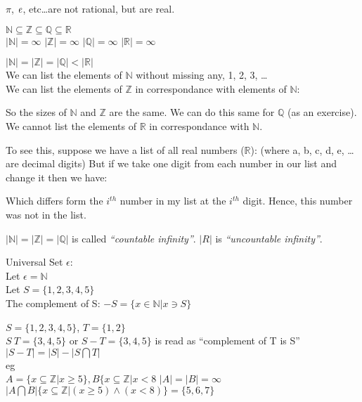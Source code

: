 $\pi$, $\emph{e}$, etc\ldots are not rational, but are real.

$\mathbb{N} \subseteq \mathbb{Z} \subseteq \mathbb{Q} \subseteq \mathbb{R} $ \\

$|\mathbb{N}| = \infty$
$|\mathbb{Z}| = \infty$
$|\mathbb{Q}| = \infty$
$|\mathbb{R}| = \infty$

$|\mathbb{N}| = |\mathbb{Z}| = |\mathbb{Q}| < |\mathbb{R}|$ \\
We can list the elements of $\mathbb{N}$ without missing any, 1, 2, 3, \ldots \\
We can list the elements of $\mathbb{Z}$ in correspondance with elements of $\mathbb{N}:$

%
%

So the sizes of $\mathbb{N}$ and $\mathbb{Z}$ are the same. We can do this same for $\mathbb{Q}$
(as an exercise). We cannot list the elements of $\mathbb{R}$ in correspondance with $\mathbb{N}$.

To see this, suppose we have a list of all real numbers ($\mathbb{R}$):
(where a, b, c, d, e, \ldots are decimal digits)
But if we take one digit from each number in our list and change it then we have:

Which differs form the $i^{th}$ number in my list at the $i^{th}$ digit. Hence, this
number was not in the list.

$|\mathbb{N}| = |\mathbb{Z}| = |\mathbb{Q}|$ is called \emph{``countable
infinity''}. $|R|$ is \emph{``uncountable infinity''}.

Universal Set $\epsilon$: \\
Let $\epsilon = \mathbb{N}$ \\
Let $S = \{1,2,3,4,5\}$ \\
The complement of S:
$ -S = \{ x \in \mathbb{N} | x \ni S \} $


$S = \{1,2,3,4,5\}$, $T = \{1,2\}$ \\
$S \ T=\{3, 4, 5\}$ or $S - T = \{3, 4, 5 \}$ is read as ``complement of T is S'' \\
$|S - T| = |S| - |S \bigcap T|$ \\
eg \\
$A = \{ x \subseteq \mathbb{Z} | x \geq 5 \}, B \{ x \subseteq \mathbb{Z} | x < 8 $
$|A| = |B| = \infty$
$|A \bigcap B | \{ x \subseteq \mathbb{Z} | (x \geq 5) \land (x < 8)\} = \{5,6,7\} $ 
